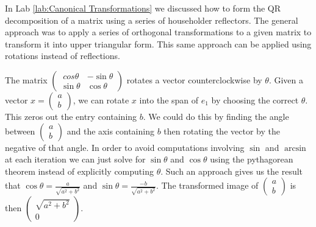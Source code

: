 \label{lab:givens}

In Lab \ref{lab:Canonical Transformations} we discussed how to form the QR decomposition of a matrix using a series of householder reflectors.
The general approach was to apply a series of orthogonal transformations to a given matrix to transform it into upper triangular form.
This same approach can be applied using rotations instead of reflections.

The matrix $\begin{pmatrix}\ cos \theta & - \sin \theta \\ \sin \theta & \cos \theta \end{pmatrix}$ rotates a vector counterclockwise by $\theta$.
Given a vector $x = \begin{pmatrix} a \\ b \end{pmatrix}$, we can rotate $x$ into the span of $e_1$ by choosing the correct $\theta$.
This zeros out the entry containing $b$.
We could do this by finding the angle between $\begin{pmatrix} a \\ b \end{pmatrix}$ and the axis containing $b$ then rotating the vector by the negative of that angle.
In order to avoid computations involving $\sin$ and $\arcsin$ at each iteration we can just solve for $\sin \theta $ and $\cos \theta$ using the pythagorean theorem instead of explicitly computing $\theta$.
Such an approach gives us the result that $\cos \theta = \frac{a}{\sqrt{a^2 + b^2}}$ and $\sin \theta = \frac{- b}{\sqrt{a^2 + b^2}}$.
The transformed image of $\begin{pmatrix} a \\ b \end{pmatrix}$ is then $\begin{pmatrix} \sqrt{a^2 + b^2} \\ 0 \end{pmatrix}$.

